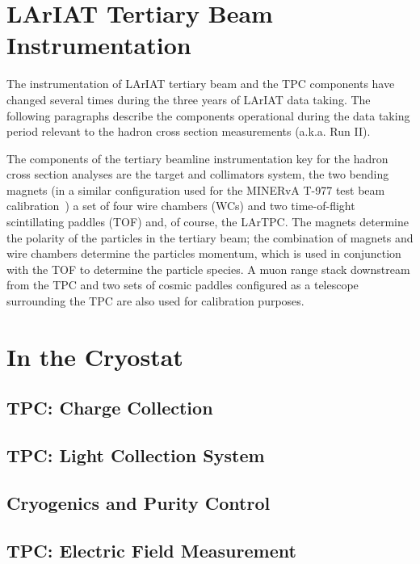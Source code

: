 \section{LArIAT Tertiary Beam Instrumentation}\label{sec:Instrumentation}

The instrumentation of  LArIAT tertiary beam and the TPC components have changed several times during the three years of LArIAT data taking. The following paragraphs describe the components operational during the data taking period relevant to the hadron cross section measurements (a.k.a. Run II).

The components of the tertiary beamline instrumentation key for the hadron cross section analyses are the target and collimators system, the two bending magnets (in a similar configuration used for the  MINERvA T-977 test beam calibration~\cite{MinervaTestbeam}) a set of four wire chambers (WCs) and two time-of-flight scintillating paddles (TOF) and, of course, the LArTPC.  The magnets determine the polarity of the particles in the tertiary beam; the combination of magnets and wire chambers determine the particles momentum, which is used in conjunction with the TOF to determine the particle species.
A muon range stack downstream from the TPC and two sets of cosmic paddles configured as a telescope surrounding the TPC are also used for calibration purposes.






\section{In the Cryostat}

\subsection{TPC: Charge Collection}\label{sec:TPC}
\subsection{TPC: Light Collection System}
\subsection{Cryogenics and Purity Control}
\subsection{TPC: Electric Field Measurement}
